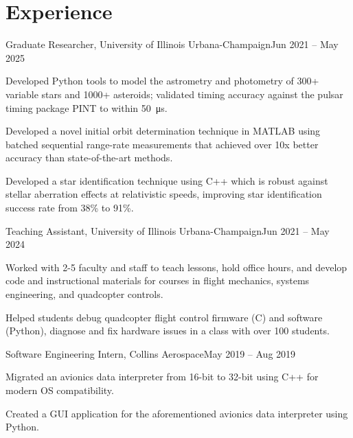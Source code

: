 \documentclass[letterpaper,11pt]{article}
\begin{document}
	
	\section{Experience}
	\begin{Experience}
		{Graduate Researcher, University of Illinois Urbana-Champaign}{Jun 2021 -- May 2025}
		{
		\item Developed Python tools to model the astrometry and photometry of 300+ variable stars and 1000+ asteroids; validated timing accuracy against the pulsar timing package PINT to within \qty{50}{\micro\s}.
		\item Developed a novel initial orbit determination technique in MATLAB using batched sequential range-rate measurements that achieved over 10x better accuracy than state-of-the-art methods. 
		\item Developed a star identification technique using C++ which is robust against stellar aberration effects at relativistic speeds, improving star identification success rate from 38\% to 91\%.
		}
	\end{Experience}
	
	\begin{Experience}
		{Teaching Assistant, University of Illinois Urbana-Champaign}{Jun 2021 -- May 2024}
		{
		\item Worked with 2-5 faculty and staff to teach lessons, hold office hours, and develop code and instructional materials for courses in flight mechanics, systems engineering, and quadcopter controls.
		\item Helped students debug quadcopter flight control firmware (C) and software (Python), diagnose and fix hardware issues in a class with over 100 students.
		}
	\end{Experience}
	
	\begin{Experience}
		{Software Engineering Intern, Collins Aerospace}{May 2019 -- Aug 2019}
		{
		\item Migrated an avionics data interpreter from 16-bit to 32-bit using C++ for modern OS compatibility.
		\item Created a GUI application for the aforementioned avionics data interpreter using Python.
		}
	\end{Experience}
	
\end{document}
